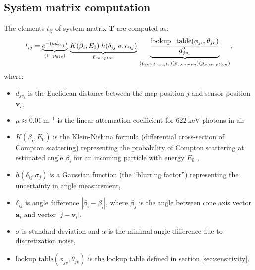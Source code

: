\subsection{System matrix computation}
The elements $t_{ij}$ of system matrix $\mathbf{T}$ are computed as:
\begin{equation}
  t_{ij} = \underset{(1-p_{air})}{\underbrace{e^{-(\mu d_{jv_{i}})}}}\ 
  \underset{\bar{p}_{compton}} {  \underbrace{K(\beta_{i}, E_{0})\ h(\delta_{ij}|\sigma, \alpha_{ij})}} \
  \underset{(p_{solid\ angle})\\(p_{compton})\\(p_{absorption})} {\underbrace{\frac{\mathrm{lookup\_table}(\phi_{jv}, \theta_{jv})}{d_{jv_{i}}^{2}}}}
  ,%
  \label{eq:system_matrix_full}
\end{equation}
where:
\begin{itemize}
 \item $d_{jv_{i}}$ is the Euclidean distance between the map position $j$ and sensor position $\mathbf{v}_{i}$, 
 \item $\mu \approx \SI{0.01}{\meter^{-1}} $ is the linear attenuation coefficient for $\SI{622}{\kilo\electronvolt}$ photons in air
 \item $K(\beta_{i}, E_{0})$ is the Klein-Nishina formula (differential cross-section of Compton scattering) representing the probability of Compton scattering at estimated angle $\beta_{i}$ for an incoming particle with energy $E_{0}$ \cite{yuemeng_feng},
\item $h(\delta_{ij}|\sigma_{j})$ is a Gaussian function (the ``blurring factor'') representing the uncertainty in angle measurement,
\item $\delta_{ij}$ is angle difference $|\beta_{i}-\beta_{j}|$, where $\beta_{j}$ is the angle between cone axis vector $\mathbf{a}_{i}$ and vector $|j-\mathbf{v}_{i}|$, 
\item $\sigma$ is standard deviation and $\alpha$ is the minimal angle difference due to discretization noise,
\item $\mathrm{lookup\_table}(\phi_{jv}, \theta_{jv})$ is the lookup table defined in section \autoref{sec:sensitivity}.
\end{itemize}

